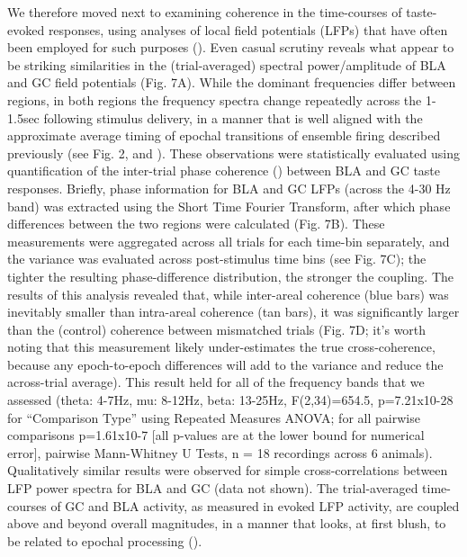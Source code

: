 \begin{refsection}
We therefore moved next to examining coherence in the time-courses of taste-evoked responses, using analyses of local field potentials (LFPs) that have often been employed for such purposes (\cite{antzoulatos2016a,place2016a,saravani2019a}). Even casual scrutiny reveals what appear to be striking similarities in the (trial-averaged) spectral power/amplitude of BLA and GC field potentials (Fig. 7A). While the dominant frequencies differ between regions, in both regions the frequency spectra change repeatedly across the 1-1.5sec following stimulus delivery, in a manner that is well aligned with the approximate average timing of epochal transitions of ensemble firing described previously (see Fig. 2, and \cite{fontanini2009a,katz2001a,sadacca2016a}). 
These observations were statistically evaluated using quantification of the inter-trial phase coherence (\cite{stitt2017a,engel2020a,kramer2020a,zareian2020a}) between BLA and GC taste responses. Briefly, phase information for BLA and GC LFPs (across the 4-30 Hz band) was extracted using the Short Time Fourier Transform, after which phase differences between the two regions were calculated (Fig. 7B). These measurements were aggregated across all trials for each time-bin separately, and the variance was evaluated across post-stimulus time bins (see Fig. 7C); the tighter the resulting phase-difference distribution, the stronger the coupling. The results of this analysis revealed that, while inter-areal coherence (blue bars) was inevitably smaller than intra-areal coherence (tan bars), it was significantly larger than the (control) coherence between mismatched trials (Fig. 7D; it’s worth noting that this measurement likely under-estimates the true cross-coherence, because any epoch-to-epoch differences will add to the variance and reduce the across-trial average). This result held for all of the frequency bands that we assessed (theta: 4-7Hz, mu: 8-12Hz, beta: 13-25Hz, F(2,34)=654.5, p=7.21x10-28 for “Comparison Type” using Repeated Measures ANOVA; for all pairwise comparisons p=1.61x10-7 [all p-values are at the lower bound for numerical error], pairwise Mann-Whitney U Tests, n = 18 recordings across 6 animals). Qualitatively similar results were observed for simple cross-correlations between LFP power spectra for BLA and GC (data not shown). The trial-averaged time-courses of GC and BLA activity, as measured in evoked LFP activity, are coupled above and beyond overall magnitudes, in a manner that looks, at first blush, to be related to epochal processing (\cite{katz2001a,fontanini2009a,sadacca2012a}).  


\end{refsection}
